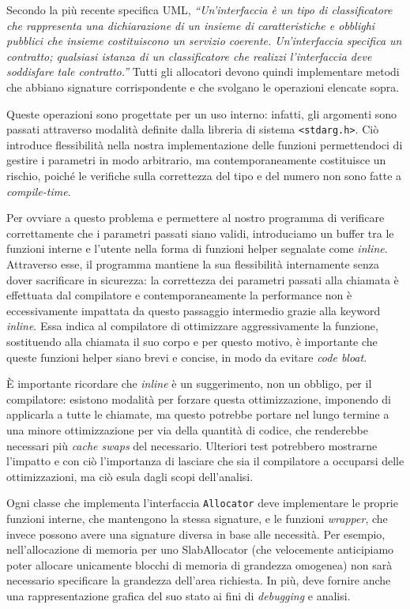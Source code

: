Secondo la più recente specifica UML,  \textit{“Un'interfaccia è un tipo di classificatore che rappresenta una dichiarazione di un insieme di caratteristiche e obblighi pubblici che insieme costituiscono un servizio coerente. Un'interfaccia specifica un contratto; qualsiasi istanza di un classificatore che realizzi l'interfaccia deve soddisfare tale contratto.”} Tutti gli allocatori devono quindi implementare metodi che abbiano signature corrispondente e che svolgano le operazioni elencate sopra.

Queste operazioni sono progettate per un uso interno: infatti, gli argomenti sono passati attraverso modalità definite dalla libreria di sistema \texttt{<stdarg.h>}. Ciò introduce flessibilità nella nostra implementazione delle funzioni permettendoci di gestire i parametri in modo arbitrario, ma contemporaneamente costituisce un rischio, poiché le verifiche sulla correttezza del tipo e del numero non sono fatte a \textit{compile-time}.

Per ovviare a questo problema e permettere al nostro programma di verificare correttamente che i parametri passati siano validi, introduciamo un buffer tra le funzioni interne e l’utente nella forma di funzioni helper segnalate come \textit{inline}. Attraverso esse, il programma mantiene la sua flessibilità internamente senza dover sacrificare in sicurezza: la correttezza dei parametri passati alla chiamata è effettuata dal compilatore e contemporaneamente la performance non è eccessivamente impattata da questo passaggio intermedio grazie alla keyword \textit{inline}. Essa indica al compilatore di ottimizzare aggressivamente la funzione, sostituendo alla chiamata il suo corpo e per questo motivo, è importante che queste funzioni helper siano brevi e concise, in modo da evitare \textit{code bloat}.

È importante ricordare che \textit{inline} è un suggerimento, non un obbligo, per il compilatore: esistono modalità per forzare questa ottimizzazione, imponendo di applicarla a tutte le chiamate, ma questo potrebbe portare nel lungo termine a una minore ottimizzazione per via della quantità di codice, che renderebbe necessari più \textit{cache swaps} del necessario. Ulteriori test potrebbero mostrarne l’impatto e con ciò l’importanza di lasciare che sia il compilatore a occuparsi delle ottimizzazioni, ma ciò esula dagli scopi dell’analisi.

Ogni classe che implementa l’interfaccia \texttt{Allocator} deve implementare le proprie funzioni interne, che mantengono la stessa signature, e le funzioni \textit{wrapper}, che invece possono avere una signature diversa in base alle necessità. Per esempio, nell’allocazione di memoria per uno SlabAllocator (che velocemente anticipiamo poter allocare unicamente blocchi di memoria di grandezza omogenea) non sarà necessario specificare la grandezza dell’area richiesta. In più, deve fornire anche una rappresentazione grafica del suo stato ai fini di \textit{debugging} e analisi.

